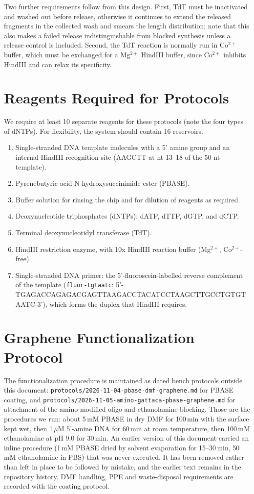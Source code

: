 \documentclass[11pt]{article}
\begin{document}
Two further requirements follow from this design.
First, TdT must be inactivated and washed out before release, otherwise it continues to extend the released fragments in the collected wash and smears the length distribution; note that this also makes a failed release indistinguishable from blocked synthesis unless a release control is included.
Second, the TdT reaction is normally run in Co$^{2+}$ buffer, which must be exchanged for a Mg$^{2+}$ HindIII buffer, since Co$^{2+}$ inhibits HindIII and can relax its specificity.

\section*{Reagents Required for Protocols}

We require at least 10 separate reagents for these protocols (note the four types of dNTPs).
For flexibility, the system should contain 16 reservoirs.

\begin{enumerate}
    \item Single-stranded DNA template molecules with a 5' amine group and an internal HindIII recognition site (AAGCTT at nt 13--18 of the 50 nt template).
    \item Pyrenebutyric acid N-hydroxysuccinimide ester (PBASE).
    \item Buffer solution for rinsing the chip and for dilution of reagents as required.
    \item Deoxynucleotide triphosphates (dNTPs): dATP, dTTP, dGTP, and dCTP.
    \item Terminal deoxynucleotidyl transferase (TdT).
    \item HindIII restriction enzyme, with 10x HindIII reaction buffer (Mg$^{2+}$, Co$^{2+}$-free).
    \item Single-stranded DNA primer: the 5'-fluoroscein-labelled reverse complement of the template (\texttt{fluor-tgtaatc}: 5'-TGAGACCAGAGACGAGTTAAGACCTACATCCTAAGCTTGCCTGTGTAATC-3'), which forms the duplex that HindIII requires.
\end{enumerate}

\section*{Graphene Functionalization Protocol}

The functionalization procedure is maintained as dated bench protocols outside this document: \texttt{protocols/2026-11-04-pbase-dmf-graphene.md} for PBASE coating, and \texttt{protocols/2026-11-05-amino-gattaca-pbase-graphene.md} for attachment of the amino-modified oligo and ethanolamine blocking.
Those are the procedures we run: about 5\,mM PBASE in dry DMF for 100\,min with the surface kept wet, then 1\,$\mu$M 5'-amine DNA for 60\,min at room temperature, then 100\,mM ethanolamine at pH 9.0 for 30\,min.
An earlier version of this document carried an inline procedure (1\,mM PBASE dried by solvent evaporation for 15--30\,min, 50\,mM ethanolamine in PBS) that was never executed.
It has been removed rather than left in place to be followed by mistake, and the earlier text remains in the repository history.
DMF handling, PPE and waste-disposal requirements are recorded with the coating protocol.
\end{document}
